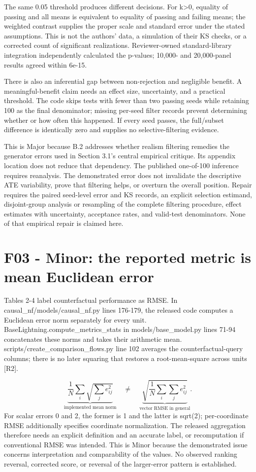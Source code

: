 \documentclass[10pt]{article}
\begin{document}
The same 0.05 threshold produces different decisions. For k>0, equality of passing and all means is equivalent to equality of passing and failing means; the weighted contrast supplies the proper scale and standard error under the stated assumptions. This is not the authors’ data, a simulation of their KS checks, or a corrected count of significant realizations. Reviewer-owned standard-library integration independently calculated the p-values; 10,000- and 20,000-panel results agreed within 6e-15.\par
There is also an inferential gap between non-rejection and negligible benefit. A meaningful-benefit claim needs an effect size, uncertainty, and a practical threshold. The code skips tests with fewer than two passing seeds while retaining 100 as the final denominator; missing per-seed filter records prevent determining whether or how often this happened. If every seed passes, the full/subset difference is identically zero and supplies no selective-filtering evidence.\par
This is Major because B.2 addresses whether realism filtering remedies the generator errors used in Section 3.1’s central empirical critique. Its appendix location does not reduce that dependency. The published one-of-100 inference requires reanalysis. The demonstrated error does not invalidate the descriptive ATE variability, prove that filtering helps, or overturn the overall position. Repair requires the paired seed-level error and KS records, an explicit selection estimand, disjoint-group analysis or resampling of the complete filtering procedure, effect estimates with uncertainty, acceptance rates, and valid-test denominators. None of that empirical repair is claimed here.\par
\section*{F03 - Minor: the reported metric is mean Euclidean error}
Tables 2-4 label counterfactual performance as RMSE. In causal\_nf/models/causal\_nf.py lines 176-179, the released code computes a Euclidean error norm separately for every unit. BaseLightning.compute\_metrics\_stats in models/base\_model.py lines 71-94 concatenates these norms and takes their arithmetic mean. scripts/create\_comparison\_flows.py line 102 averages the counterfactual-query columns; there is no later squaring that restores a root-mean-square across units [R2].\par
\[\underbrace{\frac1N\sum_i\sqrt{\sum_j e_{ij}^2}}_{\text{implemented mean norm}}\quad\ne\quad\underbrace{\sqrt{\frac1N\sum_i\sum_j e_{ij}^2}}_{\text{vector RMSE in general}}.\] For scalar errors 0 and 2, the former is 1 and the latter is sqrt(2); per-coordinate RMSE additionally specifies coordinate normalization. The released aggregation therefore needs an explicit definition and an accurate label, or recomputation if conventional RMSE was intended. This is Minor because the demonstrated issue concerns interpretation and comparability of the values. No observed ranking reversal, corrected score, or reversal of the larger-error pattern is established.\par
\end{document}
